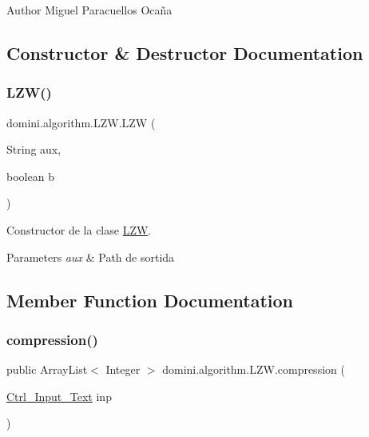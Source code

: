 \begin{DoxyAuthor}{Author}
Miguel Paracuellos Ocaña 
\end{DoxyAuthor}


\subsection{Constructor \& Destructor Documentation}
\mbox{\label{classdomini_1_1algorithm_1_1LZW_a00bd43f0691ac9679e6232b701e535ec}} 
\subsubsection{\texorpdfstring{L\+Z\+W()}{LZW()}}
{\footnotesize\ttfamily domini.\+algorithm.\+L\+Z\+W.\+L\+ZW (\begin{DoxyParamCaption}\item[{String}]{aux,  }\item[{boolean}]{b }\end{DoxyParamCaption})\hspace{0.3cm}{\ttfamily [inline]}}



Constructor de la clase \hyperlink{classdomini_1_1algorithm_1_1LZW}{L\+ZW}. 


\begin{DoxyParams}{Parameters}
{\em aux} & Path de sortida \\
\hline
\end{DoxyParams}


\subsection{Member Function Documentation}
\mbox{\label{classdomini_1_1algorithm_1_1LZW_a79ce338289c3e8fcdd111ca029cfb45b}} 
\subsubsection{\texorpdfstring{compression()}{compression()}}
{\footnotesize\ttfamily public Array\+List$<$ Integer $>$ domini.\+algorithm.\+L\+Z\+W.\+compression (\begin{DoxyParamCaption}\item[{\hyperlink{classpersistencia_1_1input_1_1Ctrl__Input__Text}{Ctrl\+\_\+\+Input\+\_\+\+Text}}]{inp }\end{DoxyParamCaption})\hspace{0.3cm}{\ttfamily [inline]}}



